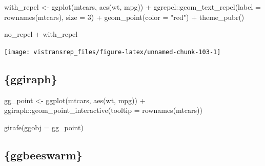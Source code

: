 \documentclass[]{book}
\newenvironment{Shaded}{}{}
\newcommand{\DataTypeTok}[1]{#1}
\newcommand{\DecValTok}[1]{#1}
\newcommand{\KeywordTok}[1]{\textcolor[rgb]{0.00,0.00,1.00}{#1}}
\newcommand{\NormalTok}[1]{#1}
\newcommand{\OperatorTok}[1]{#1}
\newcommand{\StringTok}[1]{\textcolor[rgb]{0.00,0.50,0.50}{#1}}
\begin{document}
\begin{Shaded}
\begin{Highlighting}[]
\NormalTok{with_repel <-}\StringTok{ }\KeywordTok{ggplot}\NormalTok{(mtcars, }\KeywordTok{aes}\NormalTok{(wt, mpg)) }\OperatorTok{+}
\StringTok{  }\NormalTok{ggrepel}\OperatorTok{::}\KeywordTok{geom_text_repel}\NormalTok{(}\DataTypeTok{label =} \KeywordTok{rownames}\NormalTok{(mtcars), }\DataTypeTok{size =} \DecValTok{3}\NormalTok{) }\OperatorTok{+}
\StringTok{  }\KeywordTok{geom_point}\NormalTok{(}\DataTypeTok{color =} \StringTok{"red"}\NormalTok{) }\OperatorTok{+}
\StringTok{  }\KeywordTok{theme_pubr}\NormalTok{()}
\end{Highlighting}
\end{Shaded}

\begin{Shaded}
\begin{Highlighting}[]
\NormalTok{no_repel }\OperatorTok{+}\StringTok{ }\NormalTok{with_repel}
\end{Highlighting}
\end{Shaded}

\begin{flushright}\texttt{[image: vistransrep\_files/figure-latex/unnamed-chunk-103-1]} \end{flushright}

\hypertarget{ggiraph}{%
\subsection{\{ggiraph\}}\label{ggiraph}}

\begin{Shaded}
\begin{Highlighting}[]
\NormalTok{gg_point <-}\StringTok{ }\KeywordTok{ggplot}\NormalTok{(mtcars, }\KeywordTok{aes}\NormalTok{(wt, mpg)) }\OperatorTok{+}
\StringTok{  }\NormalTok{ggiraph}\OperatorTok{::}\KeywordTok{geom_point_interactive}\NormalTok{(}\DataTypeTok{tooltip =} \KeywordTok{rownames}\NormalTok{(mtcars))}

\KeywordTok{girafe}\NormalTok{(}\DataTypeTok{ggobj =}\NormalTok{ gg_point)}
\end{Highlighting}
\end{Shaded}

\hypertarget{htmlwidget-63e63ac58891cc86e873}{}

\hypertarget{ggbeeswarm}{%
\subsection{\{ggbeeswarm\}}\label{ggbeeswarm}}
\end{document}
